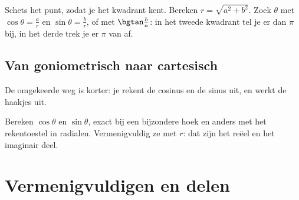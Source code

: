 \begin{werkwijze}
Schets het punt, zodat je het kwadrant kent. Bereken $r = \sqrt{a^2 + b^2}$. Zoek $\theta$ met $\cos\theta = \frac{a}{r}$ en $\sin\theta = \frac{b}{r}$, of met $\bgtan\frac{b}{a}$: in het tweede kwadrant tel je er dan $\pi$ bij, in het derde trek je er $\pi$ van af.
\end{werkwijze}


\begin{oefeningen}

\end{oefeningen}

\subsection{Van goniometrisch naar cartesisch}

De omgekeerde weg is korter: je rekent de cosinus en de sinus uit, en werkt de haakjes uit.


\begin{werkwijze}
Bereken $\cos\theta$ en $\sin\theta$, exact bij een bijzondere hoek en anders met het rekentoestel in radialen. Vermenigvuldig ze met $r$: dat zijn het reëel en het imaginair deel.
\end{werkwijze}

\begin{oefeningen}
\end{oefeningen}

\section{Vermenigvuldigen en delen}

